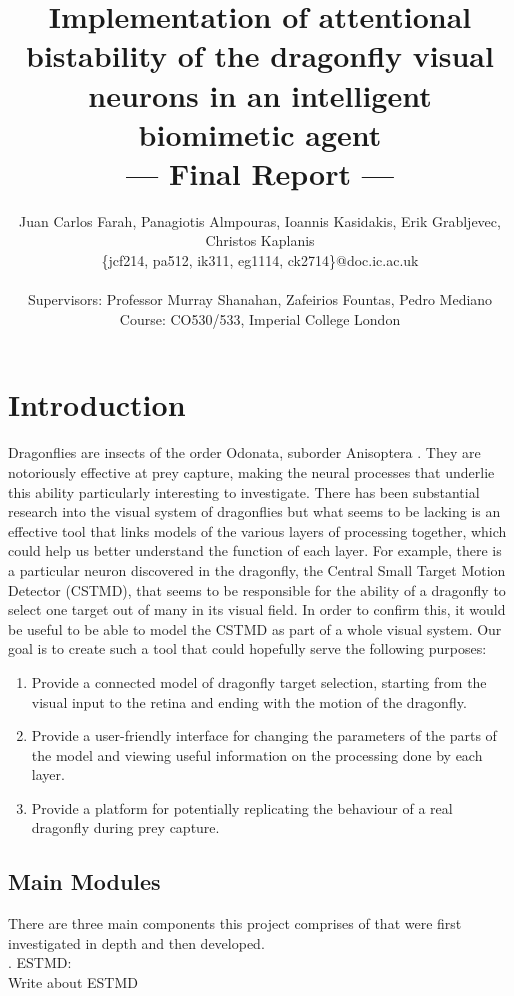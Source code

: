 \documentclass[a4paper,11pt]{article}
\title{Implementation of attentional bistability of the dragonfly visual neurons in an intelligent biomimetic agent\\\Large{--- Final Report ---}}
\author{Juan Carlos Farah, Panagiotis Almpouras, Ioannis Kasidakis, Erik Grabljevec, Christos Kaplanis\\
       \{jcf214, pa512, ik311, eg1114, ck2714\}@doc.ic.ac.uk\\ \\
       \small{Supervisors: Professor Murray Shanahan, Zafeirios Fountas, Pedro Mediano}\\
       \small{Course: CO530/533, Imperial College London}
}
\begin{document}
\maketitle

\section{Introduction}

Dragonflies are insects of the order Odonata, suborder Anisoptera \cite{dfwiki}. They are notoriously effective at prey capture, making the neural processes that underlie this ability particularly interesting to investigate. There has been substantial research into the visual system of dragonflies but what seems to be lacking is an effective tool that links models of the various layers of processing together, which could help us better understand the function of each layer. For example, there is a particular neuron discovered in the dragonfly, the Central Small Target Motion Detector (CSTMD), that seems to be responsible for the ability of a dragonfly to select one target out of many in its visual field. In order to confirm this, it would be useful to be able to model the CSTMD as part of a whole visual system. Our goal is to create such a tool that could hopefully serve the following purposes:
\begin{enumerate}
\item Provide a connected model of dragonfly target selection, starting from the visual input to the retina and ending with the motion of the dragonfly.
\item Provide a user-friendly interface for changing the parameters of the parts of the model and viewing useful information on the processing done by each layer.
\item Provide a platform for potentially replicating the behaviour of a real dragonfly during prey capture.
\end{enumerate}


\subsection{Main Modules} 
There are three main components this project comprises  of that were first investigated in depth and then developed.\\

. ESTMD:\\
Write about ESTMD\\
\end{document}
